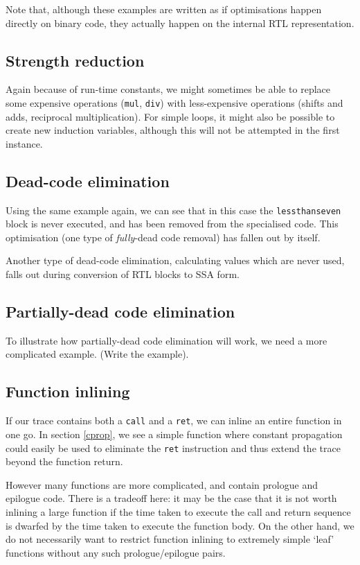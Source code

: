 Note that, although these examples are written as if optimisations happen directly on binary code, they actually happen on the internal RTL representation.

\subsection{Strength reduction}

Again because of run-time constants, we might sometimes be able to replace some expensive operations (\texttt{mul}, \texttt{div}) with less-expensive operations (shifts and adds, reciprocal multiplication). For simple loops, it might also be possible to create new induction variables, although this will not be attempted in the first instance.

\subsection{Dead-code elimination}

Using the same example again, we can see that in this case the \texttt{lessthanseven} block is never executed, and has been removed from the specialised code. This optimisation (one type of \emph{fully}-dead code removal) has fallen out by itself.

Another type of dead-code elimination, calculating values which are never used, falls out during conversion of RTL blocks to SSA form.

\subsection{Partially-dead code elimination}

To illustrate how partially-dead code elimination will work, we need a more complicated example. (Write the example).

\subsection{\label{fninline}Function inlining}

If our trace contains both a \texttt{call} and a \texttt{ret}, we can inline an entire function in one go. In section \ref{cprop}, we see a simple function where constant propagation could easily be used to eliminate the \texttt{ret} instruction and thus extend the trace beyond the function return.

However many functions are more complicated, and contain prologue and epilogue code. There is a tradeoff here: it may be the case that it is not worth inlining a large function if the time taken to execute the call and return sequence is dwarfed by the time taken to execute the function body. On the other hand, we do not necessarily want to restrict function inlining to extremely simple `leaf' functions without any such prologue/epilogue pairs.

